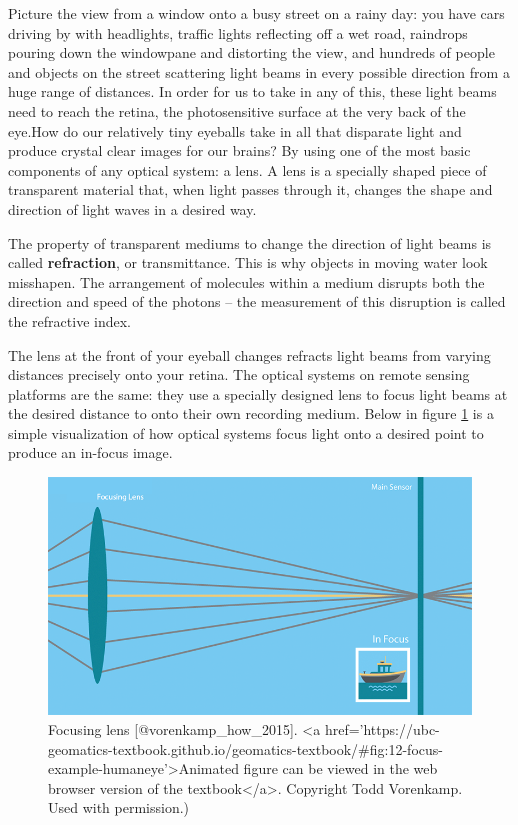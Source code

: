 \documentclass[
]{book}
\begin{document}
Picture the view from a window onto a busy street on a rainy day: you have cars driving by with headlights, traffic lights reflecting off a wet road, raindrops pouring down the windowpane and distorting the view, and hundreds of people and objects on the street scattering light beams in every possible direction from a huge range of distances. In order for us to take in any of this, these light beams need to reach the retina, the photosensitive surface at the very back of the eye.How do our relatively tiny eyeballs take in all that disparate light and produce crystal clear images for our brains? By using one of the most basic components of any optical system: a lens. A lens is a specially shaped piece of transparent material that, when light passes through it, changes the shape and direction of light waves in a desired way.

The property of transparent mediums to change the direction of light beams is called \textbf{refraction}, or transmittance. This is why objects in moving water look misshapen. The arrangement of molecules within a medium disrupts both the direction and speed of the photons -- the measurement of this disruption is called the refractive index.

The lens at the front of your eyeball changes refracts light beams from varying distances precisely onto your retina. The optical systems on remote sensing platforms are the same: they use a specially designed lens to focus light beams at the desired distance to onto their own recording medium. Below in figure \ref{fig:12-focus-example-humaneye} is a simple visualization of how optical systems focus light onto a desired point to produce an in-focus image.

\begin{figure}
\includegraphics[width=0.9\linewidth]{images/12-focus_example_humaneye} \caption{Focusing lens [@vorenkamp_how_2015]. <a href='https://ubc-geomatics-textbook.github.io/geomatics-textbook/#fig:12-focus-example-humaneye'>Animated figure can be viewed in the web browser version of the textbook</a>. Copyright Todd Vorenkamp. Used with permission.)}\label{fig:12-focus-example-humaneye}
\end{figure}
\end{document}
